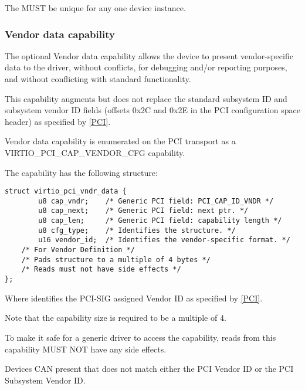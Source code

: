 The  MUST be unique for any one device instance.

\subsubsection{Vendor data capability}\label{sec:Virtio
Transport Options / Virtio Over PCI Bus / PCI Device Layout /
Vendor data capability}

The optional Vendor data capability allows the device to present
vendor-specific data to the driver, without
conflicts, for debugging and/or reporting purposes,
and without conflicting with standard functionality.

This capability augments but does not replace the standard
subsystem ID and subsystem vendor ID fields
(offsets 0x2C and 0x2E in the PCI configuration space header)
as specified by \hyperref[intro:PCI]{[PCI]}.

Vendor data capability is enumerated on the PCI transport
as a VIRTIO_PCI_CAP_VENDOR_CFG capability.

The capability has the following structure:
\begin{lstlisting}
struct virtio_pci_vndr_data {
        u8 cap_vndr;    /* Generic PCI field: PCI_CAP_ID_VNDR */
        u8 cap_next;    /* Generic PCI field: next ptr. */
        u8 cap_len;     /* Generic PCI field: capability length */
        u8 cfg_type;    /* Identifies the structure. */
        u16 vendor_id;  /* Identifies the vendor-specific format. */
	/* For Vendor Definition */
	/* Pads structure to a multiple of 4 bytes */
	/* Reads must not have side effects */
};
\end{lstlisting}

Where  identifies the PCI-SIG assigned Vendor ID
as specified by \hyperref[intro:PCI]{[PCI]}.

Note that the capability size is required to be a multiple of 4.

To make it safe for a generic driver to access the capability,
reads from this capability MUST NOT have any side effects.


Devices CAN present  that does not match
either the PCI Vendor ID or the PCI Subsystem Vendor ID.

